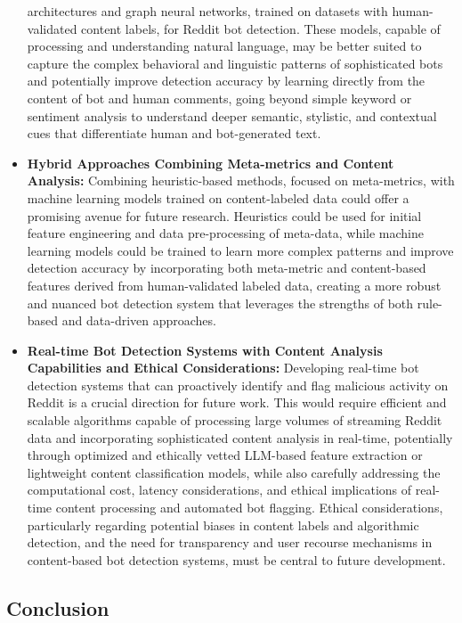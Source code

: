 \documentclass[
  12pt,
  letterpaper,
  DIV=11,
  numbers=noendperiod]{scrartcl}
\begin{document}
\begin{itemize}
  architectures and graph neural networks, trained on datasets with
  human-validated content labels, for Reddit bot detection. These
  models, capable of processing and understanding natural language, may
  be better suited to capture the complex behavioral and linguistic
  patterns of sophisticated bots and potentially improve detection
  accuracy by learning directly from the content of bot and human
  comments, going beyond simple keyword or sentiment analysis to
  understand deeper semantic, stylistic, and contextual cues that
  differentiate human and bot-generated text.
\item
  \textbf{Hybrid Approaches Combining Meta-metrics and Content
  Analysis:} Combining heuristic-based methods, focused on meta-metrics,
  with machine learning models trained on content-labeled data could
  offer a promising avenue for future research. Heuristics could be used
  for initial feature engineering and data pre-processing of meta-data,
  while machine learning models could be trained to learn more complex
  patterns and improve detection accuracy by incorporating both
  meta-metric and content-based features derived from human-validated
  labeled data, creating a more robust and nuanced bot detection system
  that leverages the strengths of both rule-based and data-driven
  approaches.
\item
  \textbf{Real-time Bot Detection Systems with Content Analysis
  Capabilities and Ethical Considerations:} Developing real-time bot
  detection systems that can proactively identify and flag malicious
  activity on Reddit is a crucial direction for future work. This would
  require efficient and scalable algorithms capable of processing large
  volumes of streaming Reddit data and incorporating sophisticated
  content analysis in real-time, potentially through optimized and
  ethically vetted LLM-based feature extraction or lightweight content
  classification models, while also carefully addressing the
  computational cost, latency considerations, and ethical implications
  of real-time content processing and automated bot flagging. Ethical
  considerations, particularly regarding potential biases in content
  labels and algorithmic detection, and the need for transparency and
  user recourse mechanisms in content-based bot detection systems, must
  be central to future development.
\end{itemize}

\subsection{Conclusion}\label{conclusion}
\end{document}
